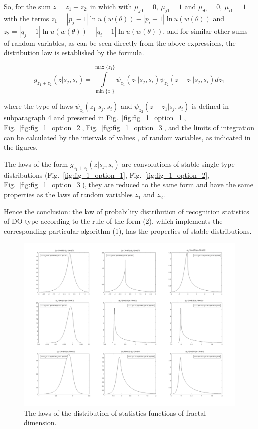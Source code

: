 So, for the sum $z={{z}_{1}}+{{z}_{2}}$, in which with ${{\mu }_{j0}}=0,\ {{\mu }_{j1}}=1$ and ${{\mu }_{i0}}=0,\ {{\mu }_{i1}}=1$ with the terms ${{z}_{1}}=\left| {{p}_{j}}-1 \right|\ln u(w(\theta ))-\left| {{p}_{i}}-1 \right|\ln u(w(\theta ))$ and ${{z}_{2}}=\left| {{q}_{j}}-1 \right|\ln u(w(\theta ))-\left| {{q}_{i}}-1 \right|\ln u(w(\theta ))$, and for similar other sums of random variables, as can be seen directly from the above expressions, the distribution law is established by the formula.

\begin{equation*}
{{g}_{{{z}_{1}}+{{z}_{2}}}}(z|{{s}_{j}},{{s}_{i}})=\int\limits_{\min \{{{z}_{1}}\}}^{\max \{{{z}_{1}}\}}{{{\psi }_{{{z}_{1}}}}({{z}_{1}}|{{s}_{j}},{{s}_{i}}){{\psi }_{{{z}_{2}}}}(z-{{z}_{1}}|{{s}_{j}},{{s}_{i}})d{{z}_{1}}}
\end{equation*}

where the type of laws ${{\psi }_{{{z}_{1}}}}({{z}_{1}}|{{s}_{j}},{{s}_{i}})$ and ${{\psi }_{{{z}_{2}}}}(z-{{z}_{1}}|{{s}_{j}},{{s}_{i}})$ is defined in subparagraph 4 and presented in Fig.~\ref{fig:fig_1_option_1}, Fig.~\ref{fig:fig_1_option_2}, Fig.~\ref{fig:fig_1_option_3}, and the limits of integration can be calculated by the intervals of values  ,   of random variables, as indicated in the figures.

The laws of the form ${{g}_{{{z}_{1}}+{{z}_{2}}}}(z|{{s}_{j}},{{s}_{i}})$ are convolutions of stable single-type distributions (Fig.~\ref{fig:fig_1_option_1}, Fig.~\ref{fig:fig_1_option_2}, Fig.~\ref{fig:fig_1_option_3}), they are reduced to the same form and have the same properties as the laws of random variables ${{z}_{1}}$ and ${{z}_{2}}$. 

Hence the conclusion: the law of probability distribution of recognition statistics of DO type according to the rule of the form (2), which implements the corresponding particular algorithm (1), has the properties of stable distributions. 


\begin{figure}[h]
\setcaptionmargin{5mm}
\onelinecaptionstrue
\includegraphics[width=1.0\textwidth]{pics/fig_2.pdf}
\caption{The laws of the distribution of statistics functions of fractal dimension.}\label{fig:fig_2}
\end{figure}

